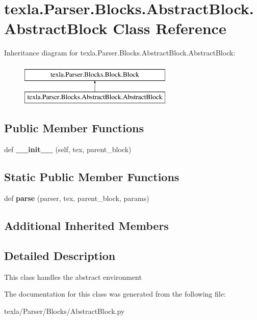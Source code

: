 \hypertarget{classtexla_1_1Parser_1_1Blocks_1_1AbstractBlock_1_1AbstractBlock}{}\section{texla.\+Parser.\+Blocks.\+Abstract\+Block.\+Abstract\+Block Class Reference}
\label{classtexla_1_1Parser_1_1Blocks_1_1AbstractBlock_1_1AbstractBlock}
Inheritance diagram for texla.\+Parser.\+Blocks.\+Abstract\+Block.\+Abstract\+Block\+:\begin{figure}[H]
\begin{center}
\leavevmode
\includegraphics[height=2.000000cm]{classtexla_1_1Parser_1_1Blocks_1_1AbstractBlock_1_1AbstractBlock}
\end{center}
\end{figure}
\subsection*{Public Member Functions}
\begin{DoxyCompactItemize}
\item 
\hypertarget{classtexla_1_1Parser_1_1Blocks_1_1AbstractBlock_1_1AbstractBlock_ad247f4c7b6221e8a7d4084aa8ce43581}{}\label{classtexla_1_1Parser_1_1Blocks_1_1AbstractBlock_1_1AbstractBlock_ad247f4c7b6221e8a7d4084aa8ce43581} 
def {\bfseries \+\_\+\+\_\+init\+\_\+\+\_\+} (self, tex, parent\+\_\+block)
\end{DoxyCompactItemize}
\subsection*{Static Public Member Functions}
\begin{DoxyCompactItemize}
\item 
\hypertarget{classtexla_1_1Parser_1_1Blocks_1_1AbstractBlock_1_1AbstractBlock_ad4ad069cc2f0446f186fb852fec3a250}{}\label{classtexla_1_1Parser_1_1Blocks_1_1AbstractBlock_1_1AbstractBlock_ad4ad069cc2f0446f186fb852fec3a250} 
def {\bfseries parse} (parser, tex, parent\+\_\+block, params)
\end{DoxyCompactItemize}
\subsection*{Additional Inherited Members}


\subsection{Detailed Description}
\begin{DoxyVerb}This class handles the abstract environment\end{DoxyVerb}
 

The documentation for this class was generated from the following file\+:\begin{DoxyCompactItemize}
\item 
texla/\+Parser/\+Blocks/Abstract\+Block.\+py\end{DoxyCompactItemize}
